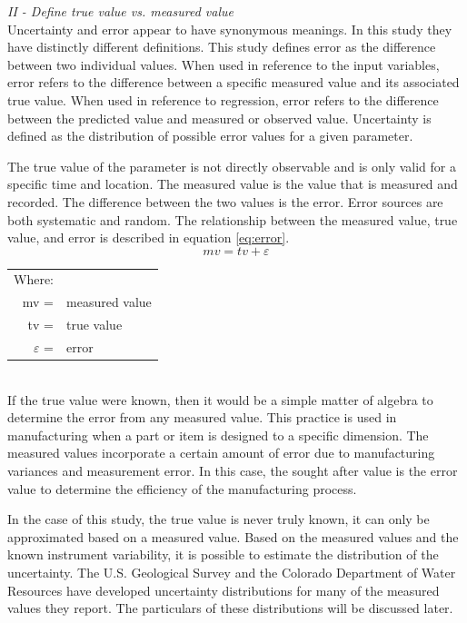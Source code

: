 \begin{linenumbers}
\emph{II - Define true value vs. measured value}\\
Uncertainty and error appear to have synonymous meanings.  In this study they have distinctly different definitions.  This study defines error as the difference between two individual values.  When used in reference to the input variables, error refers to the difference between a specific measured value and its associated true value.  When used in reference to regression, error refers to the difference between the predicted value and measured or observed value.  Uncertainty is defined as the distribution of possible error values for a given parameter.

The true value of the parameter is not directly observable and is only valid for a specific time and location.  The measured value is the value that is measured and recorded.  The difference between the two values is the error.  Error sources are both systematic and random.  The relationship between the measured value, true value, and error is described in equation \ref{eq:error}.
\begin{equation}
\label{eq:error}
mv=tv+\varepsilon
\end{equation}
\begin{tabular}{r l}
Where:&\\
mv = & measured value\\
tv = & true value\\
$\varepsilon$ = & error\\
\end{tabular}\\

If the true value were known, then it would be a simple matter of algebra to determine the error from any measured value.  This practice is used in manufacturing when a part or item is designed to a specific dimension.  The measured values incorporate a certain amount of error due to manufacturing variances and measurement error.  In this case, the sought after value is the error value to determine the efficiency of the manufacturing process.

In the case of this study, the true value is never truly known, it can only be approximated based on a measured value.  Based on the measured values and the known instrument variability, it is possible to estimate the distribution of the uncertainty.  The U.S. Geological Survey and the Colorado Department of Water Resources have developed uncertainty distributions for many of the measured values they report.  The particulars of these distributions will be discussed later.


\end{linenumbers}
